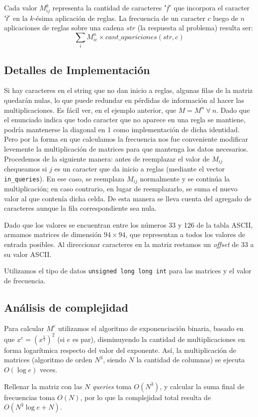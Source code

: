 Cada valor $M_{ij}^k$ representa la cantidad de caracteres $`j'$ que incorpora
el caracter $`i'$ en la $k$-ésima aplicación de reglas. La frecuencia
de un caracter $c$ luego de $n$ aplicaciones de reglas sobre una cadena $str$
(la respuesta al problema) resulta ser:
$$\sum_i M_{ic}^n \times cant\_apariciones(str, c)$$


\subsection*{Detalles de Implementación}

Si hay caracteres en el string que no dan inicio a reglas, algunas filas de
la matriz quedarán nulas, lo que puede redundar en pérdidas de información al
hacer las multiplicaciones. Es fácil ver, en el ejemplo anterior, que $M=M^n\
\forall\ n$. Dado que el enunciado indica que todo caracter que no aparece en
una regla se mantiene, podría mantenerse la diagonal en 1 como implementación
de dicha identidad. Pero por la forma en que calculamos la frecuencia nos fue
conveniente modificar levemente la multiplicación de matrices para que
mantenga los datos necesarios. Procedemos de la siguiente manera: antes de
reemplazar el valor de $M_{ij}$ chequeamos si $j$ es un caracter que da
inicio a reglas (mediante el vector {\tt in\_queries}). En ese caso, se
reemplaza $M_{ij}$ normalmente y se continúa la multiplicación; en caso
contrario, en lugar de reemplazarlo, se suma el nuevo valor al que contenía
dicha celda. De esta manera se lleva cuenta del agregado de caracteres aunque
la fila correspondiente sea nula.

Dado que los valores se encuentran entre los números 33 y 126 de la tabla ASCII,
armamos matrices de dimensión $94\times 94$, que representan a todos los valores
de entrada posibles. Al direccionar caracteres en la matriz restamos un {\sl offset}
de 33 a su valor ASCII.

Utilizamos el tipo de datos {\tt unsigned long long int} para las matrices y
el valor de frecuencia.


\subsection*{Análisis de complejidad}

Para calcular $M^e$ utilizamos el algoritmo de exponenciación binaria, basado en
que $x^e = (x^\frac e 2)^2$ (si $e$ es par), disminuyendo la cantidad de
multiplicaciones en forma logarítmica respecto del valor del exponente. Así, la
multiplicación de matrices (algoritmo de orden $N^3$, siendo $N$
la cantidad de columnas) se ejecuta $O(\log e)$ veces.

Rellenar la matriz con las $N$ {\sl queries} toma $O(N^3)$, y calcular la suma
final de frecuencias toma $O(N)$, por lo que la complejidad total resulta de
$O(N^3\log e + N)$.
